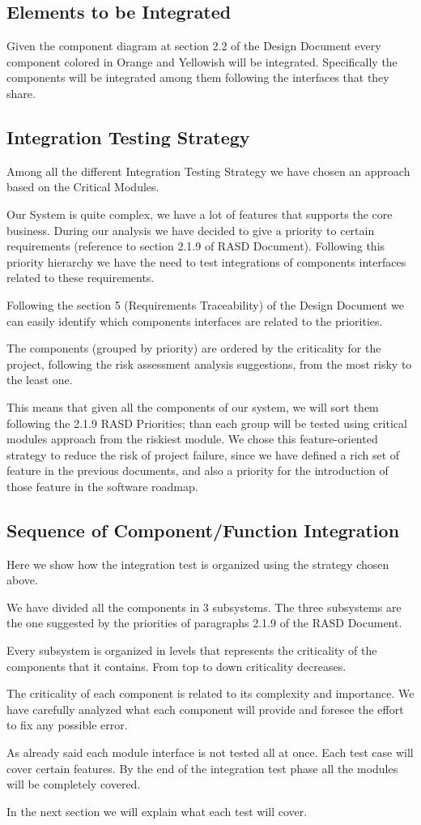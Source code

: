 \documentclass[english]{article}
\begin{document}
	\subsection{Elements to be Integrated}
	Given the component diagram at section 2.2 of the Design Document every component colored in Orange and Yellowish will be integrated.
	Specifically the components will be integrated among them following the interfaces that they share.
	\subsection{Integration Testing Strategy}
	Among all the different Integration Testing Strategy we have chosen an approach based on the Critical Modules. 
	\par Our System is quite complex, we have a lot of features that supports the core business. During our analysis we have decided to give a priority to certain requirements (reference to section 2.1.9 of RASD Document). Following this priority hierarchy we have the need to test integrations of components interfaces related to these requirements. 
	\par Following the section 5 (Requirements Traceability) of the Design Document we can easily identify which components interfaces are related to the priorities. 
	\par The components (grouped by priority) are ordered by the criticality for the project, following the risk assessment analysis suggestions, from the most risky to the least one.
	\par This means that given all the components of our system, we will sort them following the 2.1.9 RASD Priorities; than each group will be tested using critical modules approach from the riskiest module.	
	We chose this feature-oriented strategy to reduce the risk of project failure, since we have defined a rich set of feature in the previous documents, and also a priority for the introduction of those feature in the software roadmap.
	\subsection{Sequence of Component/Function Integration}
		Here we show how the integration test is organized using the strategy chosen above. 
		\par We have divided all the components in 3 subsystems. The three subsystems  are the one suggested by the priorities of paragraphs 2.1.9 of the RASD Document.
		\par Every subsystem is organized in levels that represents the criticality of the components that it contains. From top to down criticality decreases. 
		\par The criticality of each component is related to its complexity and importance. We have carefully analyzed what each component will provide and foresee the effort to fix  any possible error. 
		\par As already said each module interface is not tested all at once. Each test case will cover certain features. By the end of the integration test phase all the modules will be completely  covered.
		\par In the next section we will explain what each test will cover.
\end{document}
